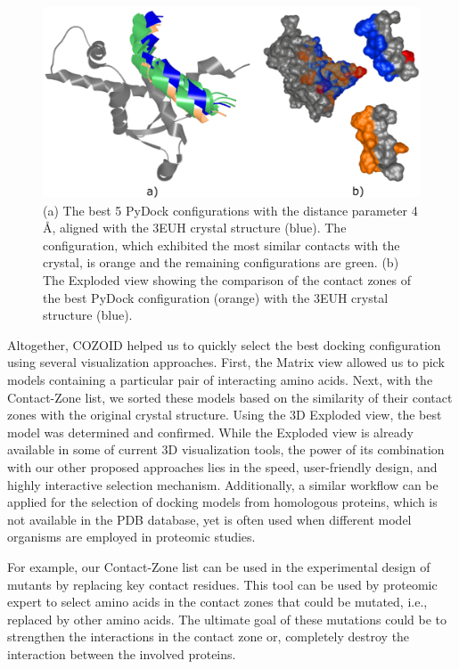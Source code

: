 \documentclass[twocolumn]{bmcart}%
\def\ExpView {Exploded view\xspace}
\def\MatView {Matrix view\xspace}
\def\CoZoList{Contact-Zone list\xspace}
\begin{document}
\begin{figure}[htb]
    \centering 
    \includegraphics[width=0.95\columnwidth]{images/figure19.pdf}
    \caption{(a) The best 5 PyDock configurations with the distance parameter 4 \AA,  aligned with the 3EUH crystal structure (blue). The configuration, which exhibited the most similar contacts with the crystal, is orange and the remaining configurations are green. (b) The \ExpView showing the comparison of the contact zones of the best PyDock configuration (orange) with the 3EUH crystal structure (blue).}
  \label{fig:pydock_pocket_string}
\end{figure}

Altogether, COZOID helped us to quickly select the best docking configuration using several visualization approaches. 
First, the \MatView allowed us to pick models containing a particular pair of interacting amino acids. 
Next, with the \CoZoList, we sorted these models based on the similarity of their contact zones with the original crystal structure. 
Using the 3D \ExpView, the best model was determined and confirmed. 
While the Exploded view is already available in some of current 3D visualization tools, the power of its combination with our other proposed approaches lies in the speed, user-friendly design, and highly interactive selection mechanism. 
Additionally, a similar workflow can be applied for the selection of docking models from homologous proteins, which is not available in the PDB database, yet is often used when different model organisms are employed in proteomic studies.
 
For example, our \CoZoList can be used in the experimental design of mutants by replacing key contact residues. 
This tool can be used by proteomic expert to select amino acids in the contact zones that could be mutated, i.e., replaced by other amino acids.
The ultimate goal of these mutations could be to strengthen the interactions in the contact zone or, completely destroy the interaction between the involved proteins. 
\end{document}
